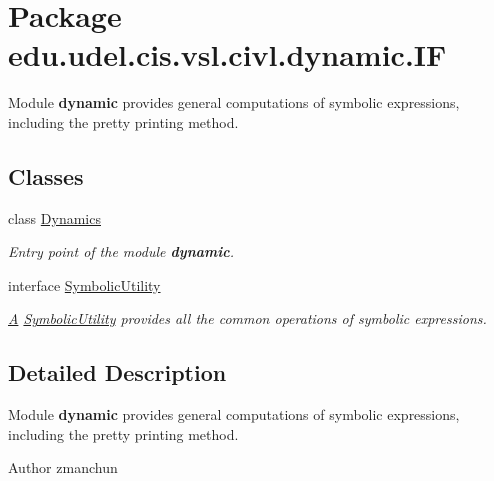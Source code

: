 \hypertarget{namespaceedu_1_1udel_1_1cis_1_1vsl_1_1civl_1_1dynamic_1_1IF}{}\section{Package edu.\+udel.\+cis.\+vsl.\+civl.\+dynamic.\+I\+F}
\label{namespaceedu_1_1udel_1_1cis_1_1vsl_1_1civl_1_1dynamic_1_1IF}


Module {\bfseries dynamic} provides general computations of symbolic expressions, including the pretty printing method.  


\subsection*{Classes}
\begin{DoxyCompactItemize}
\item 
class \hyperlink{classedu_1_1udel_1_1cis_1_1vsl_1_1civl_1_1dynamic_1_1IF_1_1Dynamics}{Dynamics}
\begin{DoxyCompactList}\small\item\em Entry point of the module {\bfseries dynamic}. \end{DoxyCompactList}\item 
interface \hyperlink{interfaceedu_1_1udel_1_1cis_1_1vsl_1_1civl_1_1dynamic_1_1IF_1_1SymbolicUtility}{Symbolic\+Utility}
\begin{DoxyCompactList}\small\item\em \hyperlink{structA}{A} \hyperlink{interfaceedu_1_1udel_1_1cis_1_1vsl_1_1civl_1_1dynamic_1_1IF_1_1SymbolicUtility}{Symbolic\+Utility} provides all the common operations of symbolic expressions. \end{DoxyCompactList}\end{DoxyCompactItemize}


\subsection{Detailed Description}
Module {\bfseries dynamic} provides general computations of symbolic expressions, including the pretty printing method. 

\begin{DoxyAuthor}{Author}
zmanchun 
\end{DoxyAuthor}
